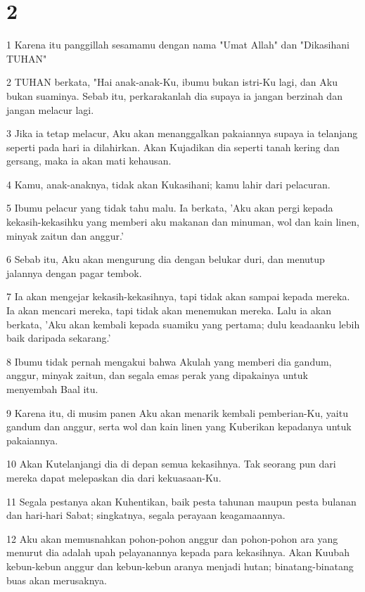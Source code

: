\chapter{2}

\par 1 Karena itu panggillah sesamamu dengan nama "Umat Allah" dan "Dikasihani TUHAN"
\par 2 TUHAN berkata, "Hai anak-anak-Ku, ibumu bukan istri-Ku lagi, dan Aku bukan suaminya. Sebab itu, perkarakanlah dia supaya ia jangan berzinah dan jangan melacur lagi.
\par 3 Jika ia tetap melacur, Aku akan menanggalkan pakaiannya supaya ia telanjang seperti pada hari ia dilahirkan. Akan Kujadikan dia seperti tanah kering dan gersang, maka ia akan mati kehausan.
\par 4 Kamu, anak-anaknya, tidak akan Kukasihani; kamu lahir dari pelacuran.
\par 5 Ibumu pelacur yang tidak tahu malu. Ia berkata, 'Aku akan pergi kepada kekasih-kekasihku yang memberi aku makanan dan minuman, wol dan kain linen, minyak zaitun dan anggur.'
\par 6 Sebab itu, Aku akan mengurung dia dengan belukar duri, dan menutup jalannya dengan pagar tembok.
\par 7 Ia akan mengejar kekasih-kekasihnya, tapi tidak akan sampai kepada mereka. Ia akan mencari mereka, tapi tidak akan menemukan mereka. Lalu ia akan berkata, 'Aku akan kembali kepada suamiku yang pertama; dulu keadaanku lebih baik daripada sekarang.'
\par 8 Ibumu tidak pernah mengakui bahwa Akulah yang memberi dia gandum, anggur, minyak zaitun, dan segala emas perak yang dipakainya untuk menyembah Baal itu.
\par 9 Karena itu, di musim panen Aku akan menarik kembali pemberian-Ku, yaitu gandum dan anggur, serta wol dan kain linen yang Kuberikan kepadanya untuk pakaiannya.
\par 10 Akan Kutelanjangi dia di depan semua kekasihnya. Tak seorang pun dari mereka dapat melepaskan dia dari kekuasaan-Ku.
\par 11 Segala pestanya akan Kuhentikan, baik pesta tahunan maupun pesta bulanan dan hari-hari Sabat; singkatnya, segala perayaan keagamaannya.
\par 12 Aku akan memusnahkan pohon-pohon anggur dan pohon-pohon ara yang menurut dia adalah upah pelayanannya kepada para kekasihnya. Akan Kuubah kebun-kebun anggur dan kebun-kebun aranya menjadi hutan; binatang-binatang buas akan merusaknya.

